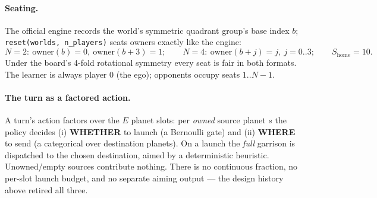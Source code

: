 \documentclass[11pt]{article}
\newcommand{\cd}[1]{\texttt{#1}}
\begin{document}
\paragraph{Seating.} The official engine records the world's symmetric quadrant group's base
index $b$; \cd{reset(worlds, n\_players)} seats owners exactly like the engine:
\[
N{=}2:\ \text{owner}(b)=0,\ \text{owner}(b{+}3)=1;\qquad
N{=}4:\ \text{owner}(b{+}j)=j,\ j=0..3;\qquad S_{\text{home}}=10 .
\]
Under the board's 4-fold rotational symmetry every seat is fair in both formats. The learner is
always player $0$ (the ego); opponents occupy seats $1..N{-}1$.

\paragraph{The turn as a factored action.} A turn's action factors over the $E$ planet slots: per
\emph{owned} source planet $s$ the policy decides (i) \textbf{WHETHER} to launch (a Bernoulli
gate) and (ii) \textbf{WHERE} to send (a categorical over destination planets). On a launch the
\emph{full} garrison is dispatched to the chosen destination, aimed by a deterministic heuristic.
Unowned/empty sources contribute nothing. There is no continuous fraction, no per-slot launch
budget, and no separate aiming output --- the design history above retired all three.

\end{document}
